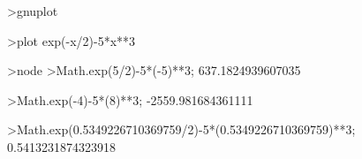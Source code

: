 >gnuplot

>plot exp(-x/2)-5*x**3

>node
>Math.exp(5/2)-5*(-5)**3;
637.1824939607035

>Math.exp(-4)-5*(8)**3;
-2559.981684361111

>Math.exp(0.5349226710369759/2)-5*(0.5349226710369759)**3;
0.5413231874323918